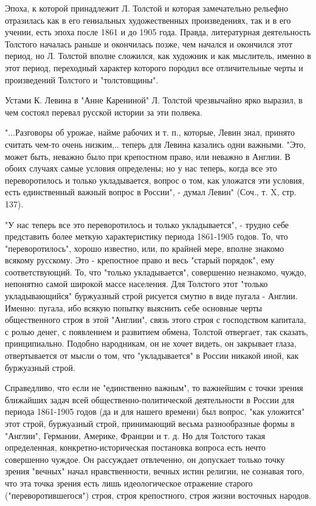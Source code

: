 \documentclass[12pt]{article}
\newcommand{\parnum}{(\arabic{parcount})}
\newcounter{parcount}
\newenvironment{parnumbers}{%
  \par%
  \everypar{\noindent \stepcounter{parcount}\marginpar[]{\parnum}}%
}{}
\begin{document}
\begin{parnumbers}
Эпоха, к которой принадлежит Л. Толстой и которая замечательно рельефно отразилась как в его гениальных художественных произведениях, так и в его учении, есть эпоха после 1861 и до 1905 года. Правда, литературная деятельность Толстого началась раньше и окончилась позже, чем начался и окончился этот период, но Л. Толстой вполне сложился, как художник и как мыслитель, именно в этот период, переходный характер которого породил все отличительные черты и произведений Толстого и "толстовщины".

Устами К. Левина в "Анне Карениной" Л. Толстой чрезвычайно ярко выразил, в чем состоял перевал русской истории за эти полвека.

"...Разговоры об урожае, найме рабочих и т. п., которые, Левин знал, принято считать чем-то очень низким,.. теперь для Левина казались одни важными. "Это, может быть, неважно было при крепостном право, или неважно в Англии. В обоих случаях самые условия определены; но у нас теперь, когда все это переворотилось и только укладывается, вопрос о том, как уложатся эти условия, есть единственный важный вопрос в России", - думал Левин" (Соч., т. X, стр. 137).

"У нас теперь все это переворотилось и только укладывается", - трудно себе представить более меткую характеристику периода 1861-1905 годов. То, что "переворотилось", хорошо известно, или, по крайней мере, вполне знакомо всякому русскому. Это - крепостное право и весь "старый порядок", ему соответствующий. То, что "только укладывается", совершенно незнакомо, чуждо, непонятно самой широкой массе населения. Для Толстого этот "только укладывающийся" буржуазный строй рисуется смутно в виде пугала - Англии. Именно: пугала, ибо всякую попытку выяснить себе основные черты общественного строя в этой "Англии", связь этого строя с господством капитала, с ролью денег, с появлением и развитием обмена, Толстой отвергает, так сказать, принципиально. Подобно народникам, он не хочет видеть, он закрывает глаза, отвертывается от мысли о том, что "укладывается" в России никакой иной, как буржуазный строй.

Справедливо, что если не "единственно важным", то важнейшим с точки зрения ближайших задач всей общественно-политической деятельности в России для периода 1861-1905 годов (да и для нашего времени) был вопрос, "как уложится" этот строй, буржуазный строй, принимающий весьма разнообразные формы в "Англии", Германии, Америке, Франции и т. д. Но для Толстого такая определенная, конкретно-историческая постановка вопроса есть нечто совершенно чуждое. Он рассуждает отвлеченно, он допускает только точку зрения "вечных" начал нравственности, вечных истин религии, не сознавая того, что эта точка зрения есть лишь идеологическое отражение старого ("переворотившегося") строя, строя крепостного, строя жизни восточных народов.


\end{parnumbers}
\end{document}
